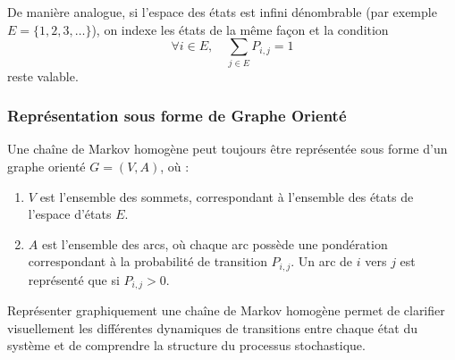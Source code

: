 \documentclass{article}
\begin{document}
De manière analogue, si l'espace des états est infini dénombrable (par exemple $E = \{1, 2, 3, \dots\}$), on indexe les états de la même façon et la condition
\[
\forall i \in E, \quad \sum_{j \in E} P_{i,j} = 1
\]
reste valable.

\subsubsection{Représentation sous forme de Graphe Orienté}
\label{subsubsec: Représentation sous forme de graphe orienté}

\begin{tcolorbox}[colback=white,colframe=red!80!black,title=Graphe Orienté d'une Chaîne de Markov]
Une chaîne de Markov homogène peut toujours être représentée sous forme d'un graphe orienté $ G = (V, A) $, où :
\begin{enumerate}[leftmargin=5em, label=(\arabic*)]
    \item $V$ est l'ensemble des sommets, correspondant à l'ensemble des états de l'espace d'états $E$.
    \item $A$ est l'ensemble des arcs, où chaque arc possède une pondération correspondant à la probabilité de transition $P_{i,j}$. Un arc de $i$ vers $j$ est représenté que si $P_{i,j} > 0$.
\end{enumerate}
\end{tcolorbox}

Représenter graphiquement une chaîne de Markov homogène permet de clarifier visuellement les différentes dynamiques de transitions entre chaque état du système et de comprendre la structure du processus stochastique. \\
\end{document}
